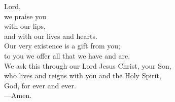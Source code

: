 \prayer


\begin{prayerverse}
Lord,\\
we praise you\\
with our lips,\\
and with our lives and hearts.\\
Our very existence is a gift from you;\\
to you we offer all that we have and are.\\
We ask this through our Lord Jesus Christ, your Son,\\
who lives and reigns with you and the Holy Spirit,\\
God, for ever and ever.\\
{\color{red}---\thinspace}Amen.
\end{prayerverse}

